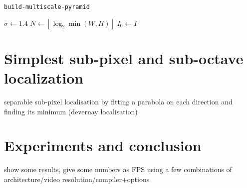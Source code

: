 \documentclass[a4paper]{article}
\begin{document}
\begin{algorithm}
	\caption{\texttt{build-multiscale-pyramid}}
	\label{alg:pyramid}
	\DontPrintSemicolon
	\BlankLine
	$\sigma\gets 1.4$\;
	$N\gets \left\lfloor\log_2\min(W,H)\right\rfloor$\;
	$I_0\leftarrow I$\;
\end{algorithm}

\section{Simplest sub-pixel and sub-octave localization}

separable sub-pixel localisation by fitting a parabola on each direction and
finding its minimum (devernay localisation)

\section{Experiments and conclusion}

show some results, give some numbers as FPS using a few combinations of
architecture/video resolution/compiler+options
\end{document}
